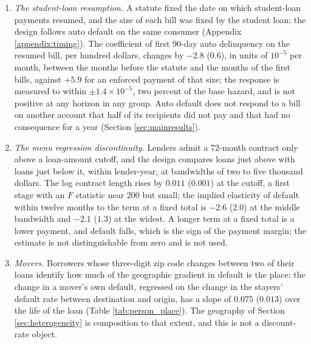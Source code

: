 \begin{enumerate}
\item \emph{The student-loan resumption.} A statute fixed the date on which student-loan payments resumed, and the size of each bill was fixed by the student loan; the design follows auto default on the same consumer (Appendix \ref{appendix:timing}). The coefficient of first 90-day auto delinquency on the resumed bill, per hundred dollars, changes by $-2.8$ ($0.6$), in units of $10^{-5}$ per month, between the months before the statute and the months of the first bills, against $+5.9$ for an enforced payment of that size; the response is measured to within $\pm 1.4 \times 10^{-5}$, two percent of the base hazard, and is not positive at any horizon in any group. Auto default does not respond to a bill on another account that half of its recipients did not pay and that had no consequence for a year (Section \ref{sec:mainresults}).

\item \emph{The menu regression discontinuity.} Lenders admit a 72-month contract only above a loan-amount cutoff, and the design compares loans just above with loans just below it, within lender-year, at bandwidths of two to five thousand dollars. The log contract length rises by $0.011$ ($0.001$) at the cutoff, a first stage with an $F$ statistic near $200$ but small; the implied elasticity of default within twelve months to the term at a fixed total is $-2.6$ ($2.0$) at the middle bandwidth and $-2.1$ ($1.3$) at the widest. A longer term at a fixed total is a lower payment, and default falls, which is the sign of the payment margin; the estimate is not distinguishable from zero and is not used.

\item \emph{Movers.} Borrowers whose three-digit zip code changes between two of their loans identify how much of the geographic gradient in default is the place: the change in a mover's own default, regressed on the change in the stayers' default rate between destination and origin, has a slope of $0.075$ ($0.013$) over the life of the loan (Table \ref{tab:person_place}). The geography of Section \ref{sec:heterogeneity} is composition to that extent, and this is not a discount-rate object.
\end{enumerate}
